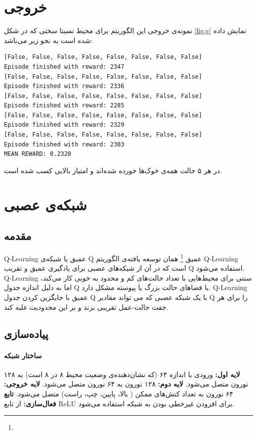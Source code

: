 \documentclass[11pt, a4paper, oneside]{report}
\begin{document}
	\section{خروجی}
	نمونه‌ی خروجی این الگوریتم برای محیط نسبتا سختی که در شکل
	  \ref{fig:g}
	نمایش داده شده است به نحو زیر می‌باشد:
	 \begin{LTR}
		\begin{verbatim}
[False, False, False, False, False, False, False, False]
Episode finished with reward: 2347
[False, False, False, False, False, False, False, False]
Episode finished with reward: 2336
[False, False, False, False, False, False, False, False]
Episode finished with reward: 2285
[False, False, False, False, False, False, False, False]
Episode finished with reward: 2329
[False, False, False, False, False, False, False, False]
Episode finished with reward: 2303
MEAN REWARD: 0.2320
		\end{verbatim}
	\end{LTR}
	در هر ۵ حالت همه‌ی خوک‌ها خورده شده‌اند و امتیاز بالایی کسب شده است.
	
	
	\section{شبکه‌ی عصبی}
	\subsection{مقدمه}
	Q-Learning عمیق 
	یا شبکه‌ی Q عمیق
	\footnote{}
	 همان توسعه یافته‌ی الگوریتم Q-Learning است که در آن از شبکه‌های عصبی برای یادگیری عمیق و تقریب Q استفاده می‌شود.
	   Q-Learning
	    سنتی برای محیط‌هایی با تعداد حالت‌های کم و محدود به خوبی کار می‌کند، اما به دلیل اندازه جدول Q با فضاهای حالت بزرگ یا پیوسته مشکل دارد.
	      Q-Learning
	  عمیق    با جایگزین کردن جدول Q با یک شبکه عصبی که می تواند مقادیر Q را برای هر جفت حالت-عمل تقریبی بزند و بر این محدودیت غلبه کند.
	
	\subsection{پیاده‌سازی}
	\paragraph{ساختار شبکه}
	\textbf{لایه اول:} 
	ورودی با اندازه ۶۴ (که نشان‌دهنده‌ی وضعیت محیط ۸ در ۸ است) به ۱۲۸ نورون متصل می‌شود.
\textbf{لایه دوم:} 
 ۱۲۸ نورون به ۶۴ نورون متصل می‌شود.
\textbf{لایه خروجی:}  ۶۴ نورون به تعداد کنش‌های ممکن ( بالا، پایین، چپ، راست) متصل می‌شود.
\textbf{ تابع فعال‌سازی:}  از تابع ReLU برای افزودن غیرخطی بودن به شبکه استفاده می‌شود.
	
\end{document}
